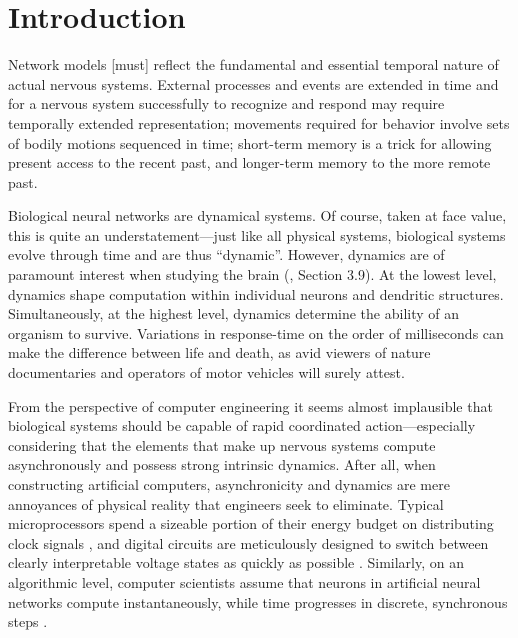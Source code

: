 \chapter{Introduction}
\label{chp:introduction}

\vspace{10pt}

\begin{OpeningQuote}
Network models [must] reflect the fundamental and
essential temporal nature of actual nervous systems. External processes and
events are extended in time and for a nervous system successfully to recognize
and respond may require temporally extended representation; movements required for behavior involve sets of bodily motions sequenced in time; short-term memory is a trick for allowing present access to the recent past, and
longer-term memory to the more remote past.
\end{OpeningQuote}


Biological neural networks are dynamical systems.
Of course, taken at face value, this is quite an understatement---just like all physical systems, biological systems evolve through time and are thus \enquote{dynamic}.
However, dynamics are of paramount interest when studying the brain (\cite{churchland1992computational}, Section 3.9).
At the lowest level, dynamics shape computation within individual neurons and dendritic structures.
Simultaneously, at the highest level, dynamics determine the ability of an organism to survive.
Variations in response-time on the order of milliseconds can make the difference between life and death, as avid viewers of nature documentaries and operators of motor vehicles will surely attest.

From the perspective of computer engineering it seems almost implausible that biological systems should be capable of rapid coordinated action---especially considering that the elements that make up nervous systems compute asynchronously and possess strong intrinsic dynamics.
After all, when constructing artificial computers, asynchronicity and dynamics are mere annoyances of physical reality that engineers seek to eliminate.
Typical microprocessors spend a sizeable portion of their energy budget on distributing clock signals \citep[e.g.,][]{zhang2008injectionlocked}, and digital circuits are meticulously designed to switch between clearly interpretable voltage states as quickly as possible \citep[e.g.,][Chapter~4]{weste2011cmos}.
Similarly, on an algorithmic level, computer scientists assume that neurons in artificial neural networks compute instantaneously, while time progresses in discrete, synchronous steps \citep[e.g.,][Chapter~10]{goodfellow2016deep}.

